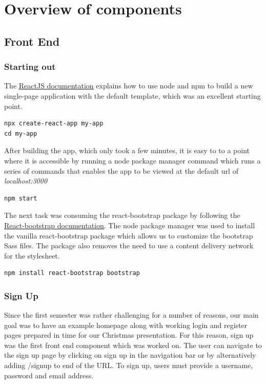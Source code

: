 \section{Overview of components}
\subsection{Front End}
\subsubsection{Starting out}
The \underline{\href{https://react-bootstrap.github.io/getting-started/introduction/}{ReactJS documentation}} explains how to use node and npm to build a new single-page application with the default template, which was an excellent starting point.
\begin{verbatim}
npx create-react-app my-app
cd my-app
\end{verbatim}

After building the app, which only took a few minutes, it is easy to to a point where it is accessible by running a node package manager command which runs a series of commands that enables the app to be viewed at the default url of \emph{localhost:3000}
\begin{verbatim}
npm start
\end{verbatim}

The next task was consuming the react-bootstrap package by following the \underline{\href{https://react-bootstrap.github.io/getting-started/introduction/}{React-bootstrap documentation}}. The node package manager was used to install the vanilla react-bootstrap package which allows us to customize the bootstrap Sass files. The package also removes the need to use a content delivery network for the stylesheet.
\begin{verbatim}
npm install react-bootstrap bootstrap
\end{verbatim}

\subsubsection{Sign Up}
Since the first semester was rather challenging for a number of reasons, our main goal was to have an example homepage along with working login and register pages prepared in time for our Christmas presentation. For this reason, sign up was the first front end component which was worked on. \newline
The user can navigate to the sign up page by clicking on sign up in the navigation bar or by alternatively adding /signup to end of the URL. To sign up, users must provide a username, password and email address.

